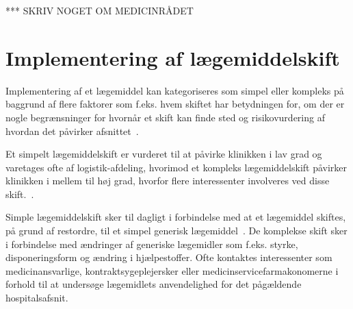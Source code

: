 *** SKRIV NOGET OM MEDICINRÅDET

\section{Implementering af lægemiddelskift}
Implementering af et lægemiddel kan kategoriseres som simpel eller kompleks på baggrund af flere faktorer som f.eks. hvem skiftet har betydningen for, om der er nogle begrænsninger for hvornår et skift kan finde sted og risikovurdering af hvordan det påvirker afsnittet~\citep{Sygehusapoteket2017b}.

Et simpelt lægemiddelskift er vurderet til at påvirke klinikken i lav grad og varetages ofte af logistik-afdeling, hvorimod et kompleks lægemiddelskift påvirker klinikken i mellem til høj grad, hvorfor flere interessenter involveres ved disse skift.~\citep{Laegemiddelinformaion2017,Sygehusapoteket2017a}. 

Simple lægemiddelskift sker til dagligt i forbindelse med at et lægemiddel skiftes, på grund af restordre, til et simpel generisk lægemiddel~\citep{Laegemiddelinformaion2017}. De komplekse skift sker i forbindelse med ændringer af generiske lægemidler som f.eks. styrke, disponeringsform og ændring i hjælpestoffer. Ofte kontaktes interessenter som medicinansvarlige, kontraktsygeplejersker eller medicinservicefarmakonomerne i forhold til at undersøge lægemidlets anvendelighed for det pågældende hospitalsafsnit.~\citep{Laegemiddelinformaion2017,Sygehusapoteket2017a}
